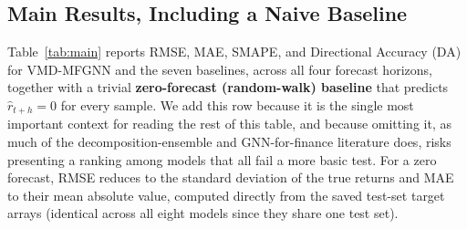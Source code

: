 \documentclass[journal]{IEEEtran}
\begin{document}
\subsection{Main Results, Including a Naive Baseline}
\label{sec:main-results}

Table~\ref{tab:main} reports RMSE, MAE, SMAPE, and Directional Accuracy (DA) for VMD-MFGNN and the seven baselines, across all four forecast horizons, together with a trivial \textbf{zero-forecast (random-walk) baseline} that predicts $\hat r_{t+h}=0$ for every sample. We add this row because it is the single most important context for reading the rest of this table, and because omitting it, as much of the decomposition-ensemble and GNN-for-finance literature does, risks presenting a ranking among models that all fail a more basic test. For a zero forecast, RMSE reduces to the standard deviation of the true returns and MAE to their mean absolute value, computed directly from the saved test-set target arrays (identical across all eight models since they share one test set).
\end{document}
